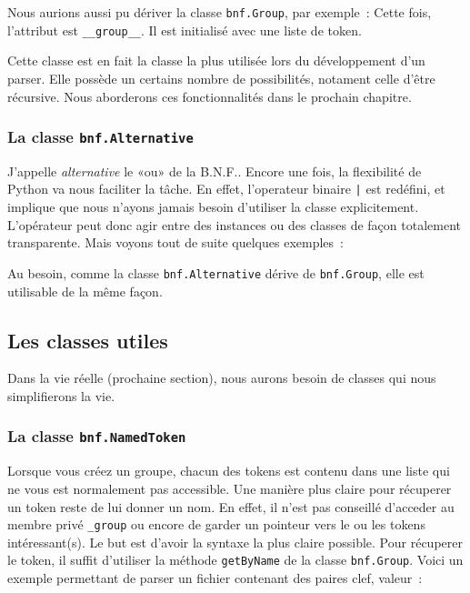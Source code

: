 \documentclass[a4paper]{article}
\newcommand{\fixed}[1]{\texttt{#1}}
\newcommand{\bnf}{B.N.F.}
\begin{document}
                Nous aurions aussi pu dériver la classe \fixed{bnf.Group}, par
                exemple~:
                Cette fois, l'attribut est \fixed{\_\_group\_\_}. Il est initialisé
                avec une liste de token.

                Cette classe est en fait la classe la plus utilisée lors du développement
                d'un parser. Elle possède un certains nombre de possibilités, notament
                celle d'être récursive. Nous aborderons ces fonctionnalités dans le
                prochain chapitre.

            \subsubsection{La classe \fixed{bnf.Alternative}}
                J'appelle \emph{alternative} le «ou» de la \bnf. Encore une fois,
                la flexibilité de Python va nous faciliter la tâche. En effet, l'operateur
                binaire \fixed{|} est redéfini, et implique que nous n'ayons jamais
                besoin d'utiliser la classe explicitement. L'opérateur peut donc agir
                entre des instances ou des classes de façon totalement transparente.
                Mais voyons tout de suite quelques exemples~:

                Au besoin, comme la classe \fixed{bnf.Alternative} dérive de \fixed{bnf.Group},
                elle est utilisable de la même façon.

        \subsection{Les classes utiles}
            Dans la vie réelle (prochaine section), nous aurons besoin de classes qui
            nous simplifierons la vie.

            \subsubsection{La classe \fixed{bnf.NamedToken}}
                Lorsque vous créez un groupe, chacun des tokens est contenu dans une liste
                qui ne vous est normalement pas accessible. Une manière plus claire pour
                récuperer un token reste de lui donner un nom. En effet, il n'est pas conseillé
                d'acceder au membre privé \fixed{\_group} ou encore de garder un pointeur vers
                le ou les tokens intéressant(s). Le but est d'avoir la syntaxe la plus
                claire possible. Pour récuperer le token, il suffit d'utiliser la méthode
                \fixed{getByName} de la classe \fixed{bnf.Group}.
                Voici un exemple permettant de parser un fichier contenant des paires clef, valeur~:
\end{document}
